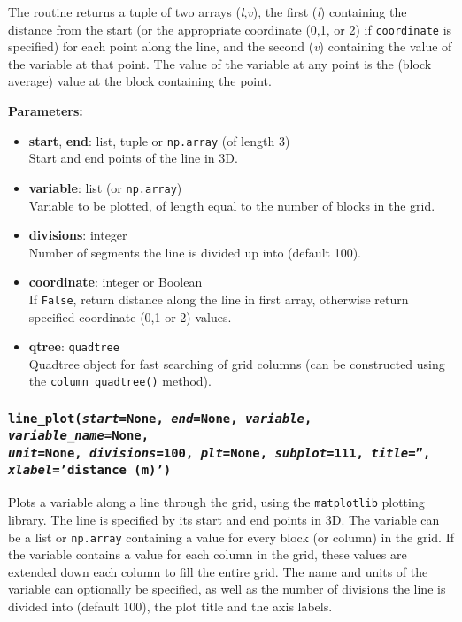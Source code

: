 The routine returns a tuple of two arrays (\emph{l},\emph{v}), the first (\emph{l}) containing the distance from the start (or the appropriate coordinate (0,1, or 2) if \texttt{coordinate} is specified) for each point along the line, and the second (\emph{v}) containing the value of the variable at that point.  The value of the variable at any point is the (block average) value at the block containing the point.


\textbf{Parameters:}
\begin{itemize}
\item \textbf{start}, \textbf{end}: list, tuple or \texttt{np.array} (of length 3)\\
  Start and end points of the line in 3D.
\item \textbf{variable}: list (or \texttt{np.array})\\
  Variable to be plotted, of length equal to the number of blocks in the grid.
\item \textbf{divisions}: integer\\
  Number of segments the line is divided up into (default 100).
\item \textbf{coordinate}: integer or Boolean\\
  If \texttt{False}, return distance along the line in first array, otherwise return specified coordinate (0,1 or 2) values.
\item \textbf{qtree}: \texttt{quadtree}\\
  Quadtree object for fast searching of grid columns (can be constructed using the \texttt{column\_quadtree()} method).
\end{itemize}

\begin{snugshade}
\subsubsection{\texttt{line\_plot(\emph{start}=None, \emph{end}=None, \emph{variable}, \emph{variable\_name}=None,\\
\emph{unit}=None, \emph{divisions}=100, \emph{plt}=None, \emph{subplot}=111, \emph{title}='',\\
\emph{xlabel}='distance (m)')}}\end{snugshade}
\label{sec:mulgrid:line_plot}

Plots a variable along a line through the grid, using the \texttt{matplotlib} plotting library. The line is specified by its start and end points in 3D.  The variable can be a list or \texttt{np.array} containing a value for every block (or column) in the grid.  If the variable contains a value for each column in the grid, these values are extended down each column to fill the entire grid.  The name and units of the variable can optionally be specified, as well as the number of divisions the line is divided into (default 100), the plot title and the axis labels.

